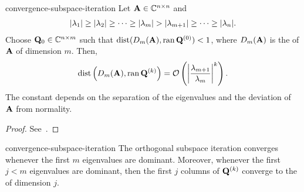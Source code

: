 \begin{Theorem}{convergence-subspace-iteration}
  Let $\mata\in\Cnn$ and
  \begin{gather}
    \abs{\lambda_1} \ge
    \abs{\lambda_2} \ge \dots \ge
    \abs{\lambda_m}>\abs{\lambda_{m+1}} \ge \dots \ge \abs{\lambda_n}.
  \end{gather}
  Choose $\matq_0 \in \C^{n\times m}$ such that
  $\dist(D_m(\mata),\ran{\matq^{(0)}}) < 1$, where $D_m(\mata)$ is the
   of $\mata$ of dimension
  $m$. Then,
  \begin{gather}
    \dist\left(D_m(\mata),\ran{\matq^{(k)}}\right)
    = \bigo \left(\abs*{\frac{\lambda_{m+1}}{\lambda_m}}^k\right).
  \end{gather}
  The constant depends on the separation of the eigenvalues and the deviation of $\mata$ from normality.
\end{Theorem}

\begin{proof}
  See~\cite[Theorem 7.3-1]{GolubVanLoan83}.
\end{proof}

\begin{Corollary}{convergence-subspace-iteration}
  The orthogonal subspace iteration converges whenever the first $m$
  eigenvalues are dominant. Moreover, whenever the first $j<m$ eigenvalues are dominant, then the first $j$ columns of $\matq^{(k)}$ converge to the  of dimension $j$.
\end{Corollary}

